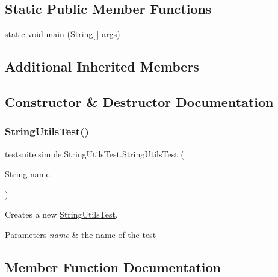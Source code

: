 \subsection*{Static Public Member Functions}
\begin{DoxyCompactItemize}
\item 
static void \mbox{\hyperlink{classtestsuite_1_1simple_1_1_string_utils_test_ac9e9be272333ccff488a510777242c77}{main}} (String\mbox{[}$\,$\mbox{]} args)
\end{DoxyCompactItemize}
\subsection*{Additional Inherited Members}


\subsection{Constructor \& Destructor Documentation}
\mbox{\label{classtestsuite_1_1simple_1_1_string_utils_test_a566d21caf24b123669b3bb7bdbba4e88}} 
\subsubsection{\texorpdfstring{String\+Utils\+Test()}{StringUtilsTest()}}
{\footnotesize\ttfamily testsuite.\+simple.\+String\+Utils\+Test.\+String\+Utils\+Test (\begin{DoxyParamCaption}\item[{String}]{name }\end{DoxyParamCaption})}

Creates a new \mbox{\hyperlink{classtestsuite_1_1simple_1_1_string_utils_test}{String\+Utils\+Test}}.


\begin{DoxyParams}{Parameters}
{\em name} & the name of the test \\
\hline
\end{DoxyParams}


\subsection{Member Function Documentation}
\mbox{\label{classtestsuite_1_1simple_1_1_string_utils_test_ac9e9be272333ccff488a510777242c77}} 
